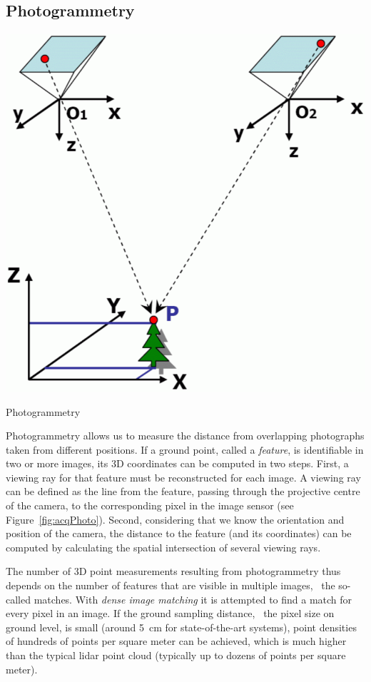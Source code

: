 \subsection{Photogrammetry}
\begin{marginfigure}
	\centering
	\includegraphics[width=\textwidth]{figs/photogrammetry.png}
	\caption{Photogrammetry}%
	\label{fig:acqPhoto}
\end{marginfigure}
Photogrammetry allows us to measure the distance from overlapping photographs taken from different positions. 
If a ground point, called a \emph{feature}, is identifiable in two or more images, its 3D coordinates can be computed in two steps. 
First, a viewing ray for that feature must be reconstructed for each image. 
A viewing ray can be defined as the line from the feature, passing through the projective centre of the camera, to the corresponding pixel in the image sensor (see Figure~\ref{fig:acqPhoto}). 
Second, considering that we know the orientation and position of the camera, the distance to the feature (and its coordinates) can be computed by calculating the spatial intersection of several viewing rays.


The number of 3D point measurements resulting from photogrammetry thus depends on the number of features that are visible in multiple images, \ie\ the so-called matches.
With \emph{dense image matching} 
it is attempted to find a match for every pixel in an image. 
If the ground sampling distance, \ie\ the pixel size on ground level, is small (around \SI{5}{\cm} for state-of-the-art systems), point densities of hundreds of points per square meter can be achieved, which is much higher than the typical lidar point cloud (typically up to dozens of points per square meter). 

